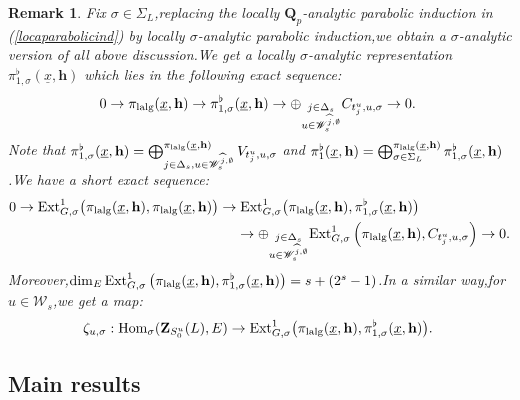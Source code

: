 \documentclass[10pt]{article}
\newtheorem{rmk}[thm]{Remark}
\newcommand{\homo}{{\rm Hom}}
\newcommand{\ext}{{\rm Ext}}
\newcommand{\lalg}{{\rm lalg}}
\newcommand{\bQ}{{\mathbf{Q}}}
\newcommand{\bZ}{{\mathbf{Z}}}
\newcommand{\bh}{{\mathbf{h}}}
\newcommand{\sW}{\mathscr W}
\begin{document}
\begin{rmk}\label{rmkforsigmaextANA}
Fix $\sigma\in\Sigma_L$,\;replacing the locally $\bQ_p$-analytic parabolic induction in (\ref{locaparabolicind}) by locally $\sigma$-analytic parabolic induction,\;we obtain a $\sigma$-analytic version of all above discussion.\;We get a locally $\sigma$-analytic representation  $\pi^{\flat}_{1,\sigma}(\underline{x},\bh)$ which lies in the following exact sequence:
\begin{equation}\label{firstwholesigma}
	0\rightarrow \pi_{\lalg}(\underline{x},\bh) \rightarrow \pi^{\flat}_{1,\sigma}(\underline{x},\bh)\rightarrow \oplus_{\substack{j\in \Delta_s\\u\in \sW_{s}^{\widehat{j},\emptyset}}}C_{t_j^u,u,\sigma}\rightarrow 0.\;
\end{equation}
Note that $\pi^{\flat}_{1,\sigma}(\underline{x},\bh)=\bigoplus^{\pi_{\lalg}(\underline{x},\bh)}_{j\in \Delta_s,u\in\sW_{s}^{\widehat{j},\emptyset}}V_{t^u_j,u,\sigma}$ and $\pi^{\flat}_{1}(\underline{x},\bh)=\bigoplus^{\pi_{\lalg}(\underline{x},\bh)}_{\sigma\in\Sigma_L}\pi^{\flat}_{1,\sigma}(\underline{x},\bh)$.\;We have  a short exact sequence:
\begin{equation}
	\begin{aligned}
		0\rightarrow \ext^1_{G,\sigma}\big(\pi_{\lalg}(\underline{x},\bh),\pi_{\lalg}(\underline{x},\bh)\big)\rightarrow &\;\ext^1_{G,\sigma}\big(\pi_{\lalg}(\underline{x},\bh),\pi^{\flat}_{1,\sigma}(\underline{x},\bh)\big)\\
		&\rightarrow \oplus_{\substack{j\in \Delta_s\\u\in \sW_{s}^{\widehat{j},\emptyset}}}  \ext^1_{G,\sigma}\left(\pi_{\lalg}(\underline{x},\bh),C_{t^u_j,u,\sigma}\right)\rightarrow 0 .
	\end{aligned}
\end{equation}
Moreover,\;$\dim_E\ext^1_{G,\sigma}\left(\pi_{\lalg}(\underline{x},\bh),\pi^{\flat}_{1,\sigma}(\underline{x},\bh)\right)=s+(2^s-1)$.\;In a similar way,\;for $u\in\sW_s$,\;we get a map:
\[\zeta_{u,\sigma}:\homo_{\sigma}(\bZ_{S^u_0}(L),E)\rightarrow\ext^1_{G,\sigma}\big(\pi_{\lalg}(\underline{x},\bh),\pi^{\flat}_{1,\sigma}(\underline{x},\bh)\big).\;\]
\end{rmk}








\subsection{Main results}\label{reconstD}
\end{document}

